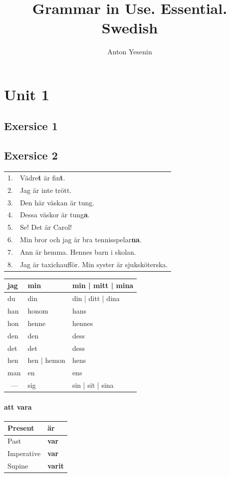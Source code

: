 \documentclass[9pt, oneside]{article}
\title{Grammar in Use. Essential. Swedish}
\author{Anton Yesenin}
\date{}
\begin{document}
\maketitle
\pagebreak

\section{Unit 1}
\subsection{Exersice 1}

\subsection{Exersice 2}

\begin{tabular}{l l}
1. & Vädre{\bfseries t} är fin{\bfseries t}.\\
2. & Jag är inte trött.\\
3. & Den här väskan är tung.\\
4. & Dessa väskor är tung{\bfseries a}.\\
5. & Se! Det är Carol!\\
6. & Min bror och jag är bra tennisspelar{\bfseries na}.\\
7. & Ann är hemma. Hennes barn i skolan.\\
8. & Jag är taxichaufför. Min syster är sjuksköterska.\\
\end{tabular}
\bigskip
\linebreak
\begin{tabular}{l|l|l}
	jag & min & min | mitt | mina\\
	\hline
	du & din & din | ditt | dina\\
	\hline
	han & honom & hans\\
	\hline
	hon & henne & hennes\\
	\hline
	den & den & dess\\
	\hline
	det & det & dess\\
	\hline
	hen & hen | hemon & hens\\
	\hline
	man & en & ens\\
	\hline
	~--- & sig & sin | sit | sina\\
\end{tabular}

\paragraph*{att vara}
\begin{tabular}{l|l}
	Present & {\bfseries är}\\
	\hline
	Past & {\bfseries var}\\
	\hline
	Imperative & {\bfseries var}\\
	\hline
	Supine & {\bfseries varit}\\
\end{tabular}
\end{document}
